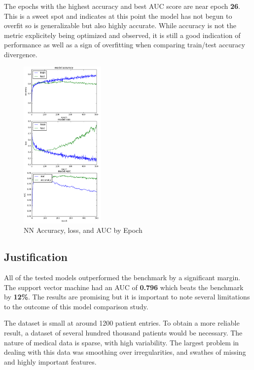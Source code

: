 \documentclass[11pt]{article}
\begin{document}
	The epochs with the highest accuracy and best AUC score are near epoch \textbf{26}. This is a sweet spot and indicates at this point the model has not begun to overfit so is generalizable but also highly accurate. While accuracy is not the metric explicitely being optimized and observed, it is still a good indication of performance as well as a sign of overfitting when comparing train/test accuracy divergence.
	
		 \begin{figure}
		\begin{center}
			\includegraphics[width=0.37\textwidth]{auc.png}
		\end{center}
		\caption{NN Accuracy, loss, and AUC by Epoch}
	\end{figure}

	
	\subsection{Justification}
	All of the tested models outperformed the benchmark by a significant margin. The support vector machine had an AUC of \textbf{0.796} which beats the benchmark by \textbf{12\%}. The results are promising but it is important to note several limitations to the outcome of this model comparison study.
	

	The dataset is small at around 1200 patient entries. To obtain a more reliable result, a dataset of several hundred thousand patients would be necessary. The nature of medical data is sparse, with high variability. The largest problem in dealing with this data was smoothing over irregularities, and swathes of missing and highly important features.
\end{document}
